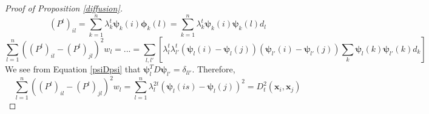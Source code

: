 \documentclass[11pt]{article}
\theoremstyle{definition}
\begin{document}
\begin{proof}[Proof of Proposition \ref{diffusion}]
\begin{equation}
	(P^t)_{il} = \sum_{k=1}^{n}\lambda_k^t\boldsymbol{\psi}_k(i)\boldsymbol{\phi}_k(l) = \sum_{k=1}^{n}\lambda_k^t\boldsymbol{\psi}_k(i)\boldsymbol{\psi}_k(l)d_l
\end{equation}
\begin{equation}
\sum_{l=1}^{n}((P^t)_{il} - (P^t)_{jl})^2w_l = ... = \sum_{l,l'} [\lambda_{l}^t \lambda_{l'}^t (\boldsymbol{\psi}_l(i) - \boldsymbol{\psi}_l(j))(\boldsymbol{\psi}_{l'}(i) - \boldsymbol{\psi}_{l'}(j)) \sum_{k} \boldsymbol{\psi}_l(k) \boldsymbol{\psi}_{l'}(k)d_k]
\end{equation}
We see from Equation \ref{psiDpsi} that $\boldsymbol{\psi}_l^T D \boldsymbol{\psi}_{l'} = \delta_{ll'}$. Therefore,
\begin{equation}
\sum_{l=1}^{n}((P^t)_{il} - (P^t)_{jl})^2w_l = \sum_{l=1}^{n}\lambda_l^{2t}(\boldsymbol{\psi}_l(is)- \boldsymbol{\psi}_l(j))^2 = D_t^2(\boldsymbol{x}_i, \boldsymbol{x}_j)
\end{equation}
\end{proof}
\end{document}
